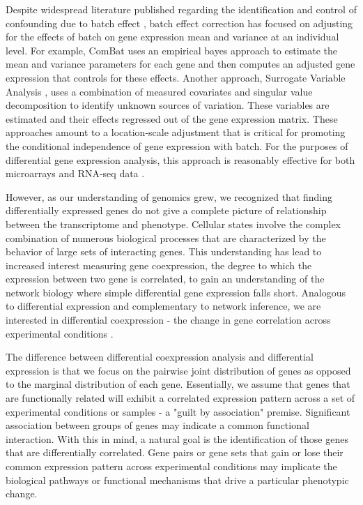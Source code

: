 Despite widespread literature published regarding the identification
and control of confounding due to batch effect \cite{chen2011removing,benito2004adjustment,leek2007capturing,johnson2007adjusting,nygaard2016methods},
batch effect correction has focused on adjusting for the effects of
batch on gene expression mean and variance at an individual level.
For example, ComBat \cite{johnson2007adjusting} uses an empirical
bayes approach to estimate the mean and variance parameters for each
gene and then computes an adjusted gene expression that controls for
these effects. Another approach, Surrogate Variable Analysis \cite{leek2007capturing},
uses a combination of measured covariates and singular value decomposition
to identify unknown sources of variation. These variables are estimated
and their effects regressed out of the gene expression matrix. These
approaches amount to a location-scale adjustment that is critical
for promoting the conditional independence of gene expression with batch. For
the purposes of differential gene expression analysis, this approach
is reasonably effective for both microarrays and RNA-seq data \cite{conesa2016survey}.

However, as our understanding of genomics grew, we recognized that
finding differentially expressed genes do not give a complete picture
of relationship between the transcriptome and phenotype. Cellular
states involve the complex combination of numerous biological processes
that are characterized by the behavior of large sets of interacting
genes. This understanding has lead to increased interest measuring
gene coexpression, the degree to which the expression between two
gene is correlated, to gain an understanding of the network biology
where simple differential gene expression falls short. Analogous to
differential expression and complementary to network inference, we
are interested in differential coexpression - the change
in gene correlation across experimental conditions \cite{fuller2007weighted}.

The difference between differential coexpression analysis and differential
expression is that we focus on the pairwise joint distribution of
genes as opposed to the marginal distribution of each gene. Essentially,
we assume that genes that are functionally related will exhibit a
correlated expression pattern across a set of experimental conditions
or samples - a "guilt by association" premise. Significant association between groups of genes may indicate a common functional
interaction. With this in mind, a natural goal is the identification
of those genes that are differentially correlated. Gene pairs or gene
sets that gain or lose their common expression pattern across experimental
conditions may implicate the biological pathways or functional mechanisms
that drive a particular phenotypic change.

